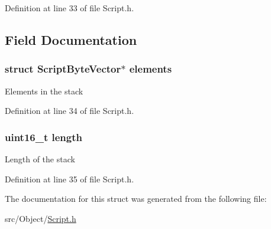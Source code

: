 Definition at line 33 of file Script.h.



\subsection{Field Documentation}
\hypertarget{struct_script_stack_a39919a8f614861eedc5579d2bf18209a}{
\subsubsection[{elements}]{\setlength{\rightskip}{0pt plus 5cm}struct {\bf ScriptByteVector}$\ast$ {\bf elements}}}
\label{struct_script_stack_a39919a8f614861eedc5579d2bf18209a}
Elements in the stack 

Definition at line 34 of file Script.h.

\hypertarget{struct_script_stack_a1892eba2086d12ac2b09005aeb09ea3b}{
\subsubsection[{length}]{\setlength{\rightskip}{0pt plus 5cm}uint16\_\-t {\bf length}}}
\label{struct_script_stack_a1892eba2086d12ac2b09005aeb09ea3b}
Length of the stack 

Definition at line 35 of file Script.h.



The documentation for this struct was generated from the following file:\begin{DoxyCompactItemize}
\item 
src/Object/\hyperlink{_script_8h}{Script.h}\end{DoxyCompactItemize}
